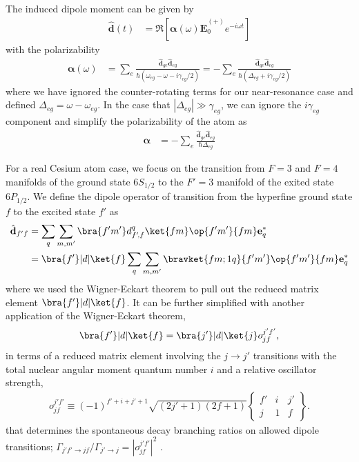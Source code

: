 \documentclass[]{report}
\begin{document}
The induced dipole moment can be given by
\begin{align}
\hat{\mathbf{d}}(t) 
&= \Re\left[ \boldsymbol{\alpha}(\omega)\hat{\mathbf{E}}_0^{(+)} e^{-i\omega t}\right]
\end{align}
with the polarizability 
\begin{align}\label{Eq::PTensorGen}
\boldsymbol{\alpha}(\omega) &=\sum_e \frac{\hat{\mathbf{d}}_{ge}\hat{\mathbf{d}}_{eg}}{\hbar(\omega_{eg} -\omega -i\gamma_{eg}/2)} =-\sum_e \frac{\hat{\mathbf{d}}_{ge}\hat{\mathbf{d}}_{eg}}{\hbar(\Delta_{eg} +i\gamma_{eg}/2)}
\end{align}
where we have ignored the counter-rotating terms for our near-resonance case and defined $ \Delta_{eg}=\omega-\omega_{eg} $. In the case that $ |\Delta_{eg} |\gg \gamma_{eg} $, we can ignore the $ i\gamma_{eg} $ component and simplify the polarizability of the atom as
\begin{align}
\boldsymbol{\alpha} &= -\sum_e \frac{\hat{\mathbf{d}}_{ge}\hat{\mathbf{d}}_{eg}}{\hbar\Delta_{eg}} 
\end{align} 

For a real Cesium atom case, we focus on the transition from $ F=3 $ and $ F=4 $ manifolds of the ground state $ 6S_{1/2} $ to the $ F'=3 $ manifold of the exited state $ 6P_{1/2} $. We define the dipole operator of transition from the hyperfine ground state $ f $ to the excited state $ f' $ as~\cite{Baragiola2014a}
\begin{align}
\hat{\mathbf{d}}_{f'f} &=  \sum_q \sum_{m, m'}  \bra{f' m'} d_{f'\!,f}^q \ket{f m} \op{f' m'}{f m} \mathbf{e}_q^* \\
& = \bra{ f' }| d | \ket{ f } \sum_q \sum_{m, m'}  \bravket{f m; 1 q}{f' m'} \op{f' m'}{f m} \mathbf{e}_q^*
\end{align}
where we used the Wigner-Eckart theorem to pull out the reduced matrix element $\bra{ f' }| d | \ket{ f } $.  It can be further simplified with another application of the Wigner-Eckart theorem,
	\begin{align}
		\bra{ f' }| d | \ket{ f } = \bra{ j' }| d | \ket{ j } o^{j' f'}_{j f},
	\end{align}
in terms of a reduced matrix element involving the $j \rightarrow j'$ transitions with the total nuclear angular moment quantum number $ i $ and a relative oscillator strength,
	\begin{align} \label{Eq::OscStrength}
		o^{j' f'}_{j f} \equiv (-1)^{f'+i + j' + 1} \sqrt{ (2 j'+1) (2f + 1) } 
			\left\{ 
				\begin{array}{ccc}
					f' & i & j' \\
					j & 1 & f
				\end{array}
			\right\} .
	\end{align}
that determines the spontaneous decay branching ratios on allowed dipole transitions; $\Gamma_{j' f' \rightarrow j f} / \Gamma_{j'\rightarrow j} = |o^{j' f'}_{j f}|^2$ \cite{Deutsch2010a}.	
	
\end{document}
